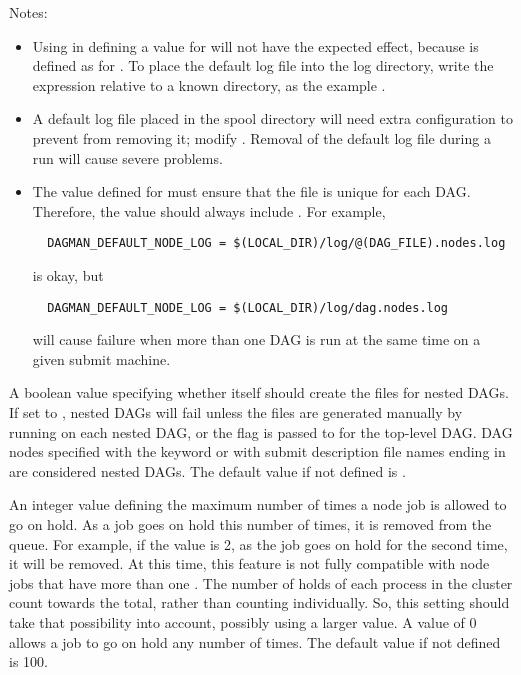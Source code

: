 \begin{description}
  Notes:
  \begin{itemize}
  \item Using  in defining a value for 
   will not have the expected effect,
  because  is defined as  for .
  To place the default log file into the log directory,
  write the expression relative to a known directory,
  as the example .
  \item A default log file placed in the spool directory
  will need extra configuration to prevent  from removing it;
  modify .
  Removal of the default log file during a run will cause severe problems.
  \item The value defined for  must
  ensure that the file is unique for each DAG.
  Therefore, the value should always include .
  For example,
  \begin{verbatim}
  DAGMAN_DEFAULT_NODE_LOG = $(LOCAL_DIR)/log/@(DAG_FILE).nodes.log
  \end{verbatim}
  is okay, but
  \begin{verbatim}
  DAGMAN_DEFAULT_NODE_LOG = $(LOCAL_DIR)/log/dag.nodes.log
  \end{verbatim}
  will cause failure when more than one DAG is run at the same time on a
  given submit machine.
  \end{itemize}

\label{param:DAGManGenerateSubDagSubmits}
\item[\Macro{DAGMAN\_GENERATE\_SUBDAG\_SUBMITS}]
  A boolean value specifying whether  itself should
  create the  files for nested DAGs.  
  If set to , nested DAGs will fail unless
  the  files are generated manually by running
    on each nested DAG, or the
   flag is passed to  for the
  top-level DAG.
  DAG nodes specified with the
   keyword or with submit description file names ending
  in  are considered nested DAGs.
  The default value if not defined is .

\label{param:DAGManMaxJobHolds}
\item[\Macro{DAGMAN\_MAX\_JOB\_HOLDS}]
  An integer value defining the maximum number of times a node job is
  allowed to go on hold. As a job goes on hold this number of
  times, it is removed from the queue.  For example, if the value
  is 2, as the job goes on hold for the second time,
  it will be removed.
  At this time, this feature is not fully compatible with node jobs
  that have more than one .
  The number of holds of each process in the cluster count towards the
  total, rather than counting individually.
  So, this setting should take that possibility into account,
  possibly using a larger value.
  A value of 0 allows a job to go on hold any number of times.
  The default value if not defined is 100.


\end{description}
